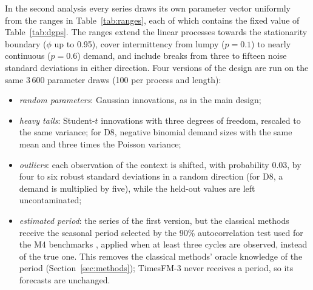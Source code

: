 \documentclass[11pt]{article}
\providecommand{\sectionref}[1]{Section~\ref{#1}}
\providecommand{\tableref}[1]{Table~\ref{#1}}
\begin{document}
In the second analysis every series draws its own parameter vector uniformly from the ranges in
\tableref{tab:ranges}, each of which contains the fixed value of \tableref{tab:dgps}. The ranges
extend the linear processes towards the stationarity boundary ($\phi$ up to 0.95), cover
intermittency from lumpy ($p = 0.1$) to nearly continuous ($p = 0.6$) demand, and include breaks
from three to fifteen noise standard deviations in either direction. Four versions of the design
are run on the same 3\,600 parameter draws (100 per process and length):

\begin{itemize}
\item \emph{random parameters}: Gaussian innovations, as in the main design;
\item \emph{heavy tails}: Student-$t$ innovations with three degrees of freedom, rescaled to the
      same variance; for D8, negative binomial demand sizes with the same mean and three times
      the Poisson variance;
\item \emph{outliers}: each observation of the context is shifted, with probability 0.03, by four
      to six robust standard deviations in a random direction (for D8, a demand is multiplied by
      five), while the held-out values are left uncontaminated;
\item \emph{estimated period}: the series of the first version, but the classical methods receive
      the seasonal period selected by the 90\% autocorrelation test used for the M4 benchmarks
      \citep{makridakis2020m4}, applied when at least three cycles are observed, instead of the
      true one. This removes the classical methods'
      oracle knowledge of the period (\sectionref{sec:methods}); TimesFM-3 never receives a
      period, so its forecasts are unchanged.
\end{itemize}
\end{document}
